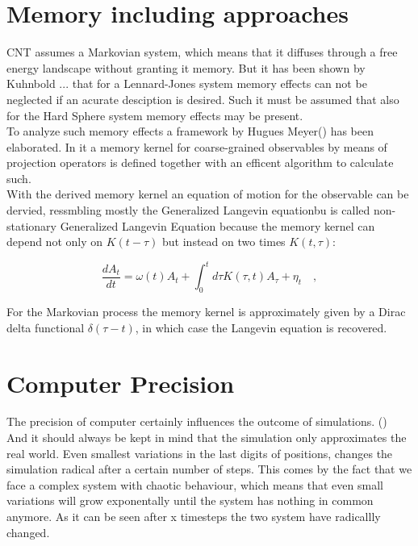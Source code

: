 

\section{Memory including approaches}
\label{sec:memory_approach}
CNT assumes a Markovian system, which means that it diffuses through a free energy landscape without granting it memory. But it has been shown by Kuhnbold ...  that for a Lennard-Jones system memory effects can not be neglected if an acurate  desciption is desired. Such it must be assumed that also for the Hard Sphere system memory effects may be present.\\

To analyze such memory effects a framework by Hugues Meyer() has been elaborated. In it a memory kernel for coarse-grained observables by means of projection operators is defined together with an efficent algorithm to calculate such.\\
With the derived memory kernel an equation of motion for the observable can be dervied, ressmbling mostly the Generalized Langevin equationbu is called non-stationary Generalized Langevin Equation because the memory kernel can depend not only on $K(t-\tau)$ but instead on two times $K(t,\tau)$:

\begin{equation}
\label{eqn:EOM_A}
  \frac{d A_{t}}{dt} = \omega (t) A_{t} + \int_{0}^{t} d\tau  K(\tau, t) A_{\tau} + \eta_{t} \quad ,
\end{equation}

For the Markovian process the memory kernel is approximately given by a Dirac delta functional $\delta(\tau-t)$, in which case the Langevin equation is recovered.


\section{Computer Precision}
\label{sec:precision}
The precision of computer certainly influences the outcome of simulations. ()\\
And it should always be kept in mind that the simulation only approximates the real world. Even smallest variations in the last digits of positions, changes the simulation radical after a certain number of steps. This comes by the fact that we face a complex system with chaotic behaviour, which means that even small variations will grow exponentally until the system has nothing in common anymore.  
As it can be seen after x timesteps the two system have radicallly changed.

